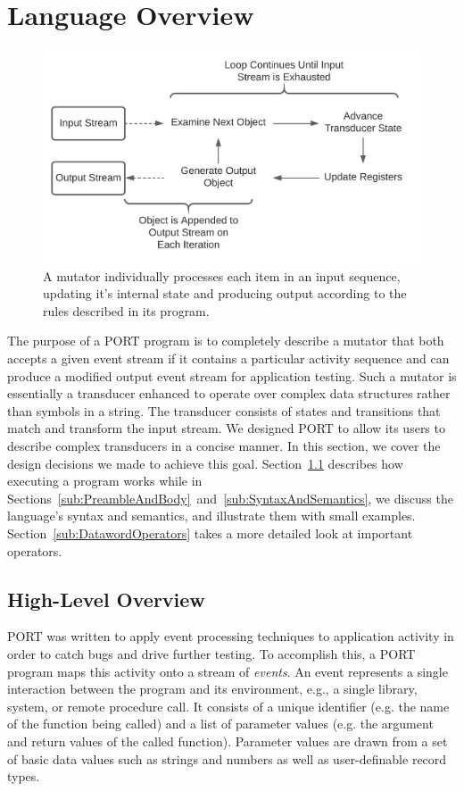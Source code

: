 \section{Language Overview}
\label{sec:Overview}

\begin{figure}[h]
  \centering
  \includegraphics[scale=.6]{images/processing}
  \caption{A mutator individually processes each item in an input
  sequence, updating it's internal state and producing output according
  to the rules described in its program.}
  \label{fig:Processing}
\end{figure}

The purpose
of a PORT program is to completely describe a mutator
that both
accepts a given event stream if it contains a particular
activity sequence and can produce a modified
output event stream
for application testing.
Such a mutator is essentially a
transducer enhanced to operate over complex data structures
rather than symbols in a string.
The transducer consists of states and transitions that match and transform the input stream.
We designed PORT to allow its users to
describe complex transducers in a concise manner.
In this section, we cover the design decisions we made
to achieve this goal.
Section~\ref{sub:ProcessingEventStreams} describes how executing a program works
while
in Sections~\ref{sub:PreambleAndBody}~and~\ref{sub:SyntaxAndSemantics},
we discuss the
language's syntax and semantics, and illustrate them
with small examples.
Section~\ref{sub:DatawordOperators} takes a more
detailed look at important operators.

\subsection{High-Level Overview}
\label{sub:ProcessingEventStreams}
PORT was written to
apply event processing
techniques to application activity
in order to catch bugs and drive further
testing.
To accomplish this, a PORT program maps this activity onto a
stream of \emph{events}. An event represents a single interaction between the program and its environment, e.g.,
a single library, system, or remote procedure call. It consists of
a unique identifier (e.g. the name of the function being called) and a list of parameter values (e.g. the argument and return values of the called function).
Parameter values are drawn from a set of basic data values such as strings and numbers as well as user-definable record types.

